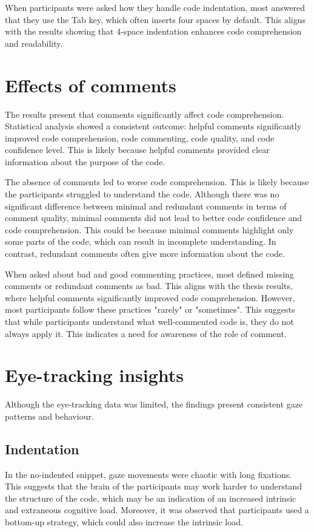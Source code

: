 When participants were asked how they handle code indentation, most answered that they use the Tab key, which often inserts four spaces by default.  This aligns with the results showing that 4-space indentation enhances code comprehension and readability.

\section{Effects of comments} 
The results present that comments significantly affect code comprehension.  Statistical analysis showed a consistent outcome: helpful comments significantly improved code comprehension, code commenting, code quality, and code confidence level. This is likely because helpful comments provided clear information about the purpose of the code. 

The absence of comments led to worse code comprehension. This is likely because the participants struggled to understand the code. Although there was no significant difference between minimal and redundant comments in terms of comment quality, minimal comments did not lead to better code confidence and code comprehension. This could be because minimal comments highlight only some parts of the code,  which can result in incomplete understanding. In contrast, redundant comments often give more information about the code.   
 

When asked about bad and good commenting practices, most defined missing comments or redundant comments as bad. This aligns with the thesis results, where helpful comments significantly improved code comprehension. However, most participants follow these practices "rarely" or "sometimes". This suggests that while participants understand what well-commented code is, they do not always apply it. This indicates a need for awareness of the role of comment.



\section{Eye-tracking insights} 
Although the eye-tracking data was limited, the findings present consistent gaze patterns and behaviour. 

\subsection{Indentation} 
In the no-indented snippet, gaze movements were chaotic with long fixations. This suggests that the brain of the participants may work harder to understand the structure of the code, which may be an indication of an increased intrinsic and extraneous cognitive load. Moreover, it was observed that participants used a bottom-up strategy, which could also increase the intrinsic load.



